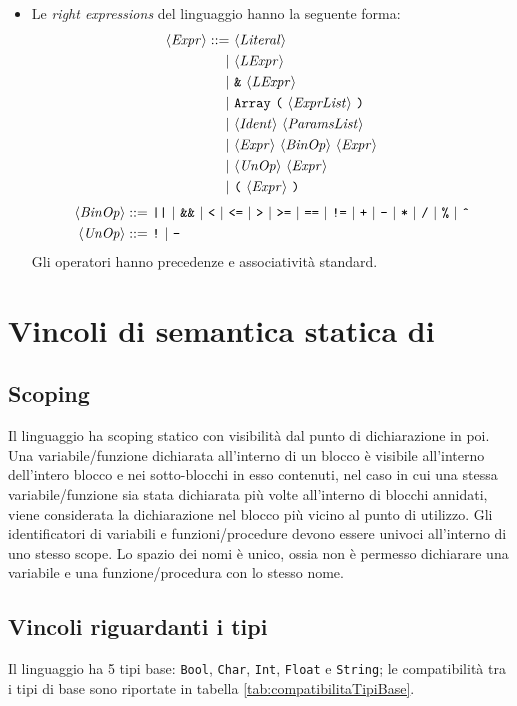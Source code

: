 \begin{itemize}
	\item Le \emph{right expressions} del linguaggio hanno la seguente forma:
	\begin{align*}
	\langle \mathit{Expr} \rangle ::=\ &\langle \mathit{Literal} \rangle\\
	|\ &\langle \mathit{LExpr} \rangle\\
	|\ &\texttt{\&}\ \langle \mathit{LExpr} \rangle\\
	|\ &\texttt{Array}\ \texttt{(}\ \langle \mathit{ExprList} \rangle\ \texttt{)}\\
	|\ &\langle \mathit{Ident} \rangle\ \langle \mathit{ParamsList} \rangle\\
	|\ &\langle \mathit{Expr} \rangle\ \langle \mathit{BinOp} \rangle\ \langle \mathit{Expr} \rangle\\
	|\ &\langle \mathit{UnOp} \rangle\ \langle \mathit{Expr} \rangle\\
	|\ &\texttt{(}\ \langle \mathit{Expr} \rangle\ \texttt{)}
	\end{align*}
	\begin{align*}
	\token{BinOp} ::=\ 
	&\texttt{||}\ |\ \texttt{\&\&}\ |\ \texttt{<}\ |\ \texttt{<=}\ |\ \texttt{>}\ |\ \texttt{>=}\ |\ \texttt{==}\ |\  \texttt{!=}\ 
	|\ \texttt{+}\ |\ \texttt{-}\ |\ \texttt{*}\ |\ \texttt{/}\ |\ \texttt{\%}\ |\ \texttt{\^{}} \\
	\token{UnOp} ::=\ &\texttt{!}\ |\ \texttt{-}
	\end{align*}
	Gli operatori hanno precedenze e associatività standard.
\end{itemize}

\section{Vincoli di semantica statica di \SBF}
\subsection*{Scoping}
Il linguaggio ha scoping statico con visibilità dal punto di dichiarazione in poi. Una variabile/funzione dichiarata all'interno di un blocco è visibile all'interno dell'intero blocco e nei sotto-blocchi in esso contenuti, nel caso in cui una stessa variabile/funzione sia stata dichiarata più volte all'interno di blocchi annidati, viene considerata la dichiarazione nel blocco più vicino al punto di utilizzo.
Gli identificatori di variabili e funzioni/procedure devono essere univoci all'interno di uno stesso scope. Lo spazio dei nomi è unico, ossia non è permesso dichiarare una variabile e una funzione/procedura con lo stesso nome. 

\subsection*{Vincoli riguardanti i tipi}
Il linguaggio ha 5 tipi base: \texttt{Bool}, \texttt{Char}, \texttt{Int}, \texttt{Float} e \texttt{String}; le compatibilità tra i tipi di base sono riportate in tabella \ref{tab:compatibilitaTipiBase}. \\

